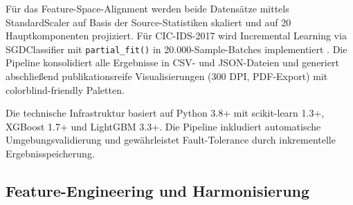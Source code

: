 \documentclass[11pt,a4paper]{article}
\begin{document}
    Für das Feature-Space-Alignment werden beide Datensätze mittels StandardScaler auf Basis der Source-Statistiken skaliert und auf 20 Hauptkomponenten projiziert. Für CIC-IDS-2017 wird Incremental Learning via SGDClassifier mit \texttt{partial\_fit()} in 20.000-Sample-Batches implementiert \parencite{Bishop2006}. Die Pipeline konsolidiert alle Ergebnisse in CSV- und JSON-Dateien und generiert abschließend publikationsreife Visualisierungen (300 DPI, PDF-Export) mit colorblind-friendly Paletten.

    Die technische Infrastruktur basiert auf Python 3.8+ mit scikit-learn 1.3+, XGBoost 1.7+ und LightGBM 3.3+. Die Pipeline inkludiert automatische Umgebungsvalidierung und gewährleistet Fault-Tolerance durch inkrementelle Ergebnisspeicherung.

    \subsection{Feature-Engineering und Harmonisierung}
\end{document}

